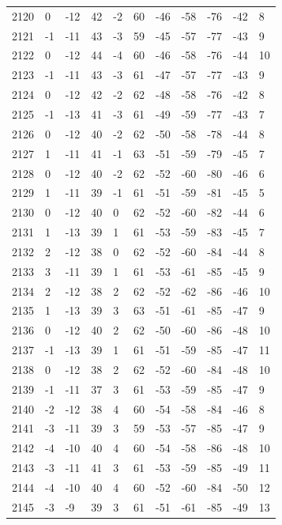 \begin{table}[H]
\begin{tabular}{lllllllllll}
2120 & 0 & -12 & 42 & -2 & 60 & -46 & -58 & -76 & -42 & 8 \\
2121 & -1 & -11 & 43 & -3 & 59 & -45 & -57 & -77 & -43 & 9 \\
2122 & 0 & -12 & 44 & -4 & 60 & -46 & -58 & -76 & -44 & 10 \\
2123 & -1 & -11 & 43 & -3 & 61 & -47 & -57 & -77 & -43 & 9 \\
2124 & 0 & -12 & 42 & -2 & 62 & -48 & -58 & -76 & -42 & 8 \\
2125 & -1 & -13 & 41 & -3 & 61 & -49 & -59 & -77 & -43 & 7 \\
2126 & 0 & -12 & 40 & -2 & 62 & -50 & -58 & -78 & -44 & 8 \\
2127 & 1 & -11 & 41 & -1 & 63 & -51 & -59 & -79 & -45 & 7 \\
2128 & 0 & -12 & 40 & -2 & 62 & -52 & -60 & -80 & -46 & 6 \\
2129 & 1 & -11 & 39 & -1 & 61 & -51 & -59 & -81 & -45 & 5 \\
2130 & 0 & -12 & 40 & 0 & 62 & -52 & -60 & -82 & -44 & 6 \\
2131 & 1 & -13 & 39 & 1 & 61 & -53 & -59 & -83 & -45 & 7 \\
2132 & 2 & -12 & 38 & 0 & 62 & -52 & -60 & -84 & -44 & 8 \\
2133 & 3 & -11 & 39 & 1 & 61 & -53 & -61 & -85 & -45 & 9 \\
2134 & 2 & -12 & 38 & 2 & 62 & -52 & -62 & -86 & -46 & 10 \\
2135 & 1 & -13 & 39 & 3 & 63 & -51 & -61 & -85 & -47 & 9 \\
2136 & 0 & -12 & 40 & 2 & 62 & -50 & -60 & -86 & -48 & 10 \\
2137 & -1 & -13 & 39 & 1 & 61 & -51 & -59 & -85 & -47 & 11 \\
2138 & 0 & -12 & 38 & 2 & 62 & -52 & -60 & -84 & -48 & 10 \\
2139 & -1 & -11 & 37 & 3 & 61 & -53 & -59 & -85 & -47 & 9 \\
2140 & -2 & -12 & 38 & 4 & 60 & -54 & -58 & -84 & -46 & 8 \\
2141 & -3 & -11 & 39 & 3 & 59 & -53 & -57 & -85 & -47 & 9 \\
2142 & -4 & -10 & 40 & 4 & 60 & -54 & -58 & -86 & -48 & 10 \\
2143 & -3 & -11 & 41 & 3 & 61 & -53 & -59 & -85 & -49 & 11 \\
2144 & -4 & -10 & 40 & 4 & 60 & -52 & -60 & -84 & -50 & 12 \\
2145 & -3 & -9 & 39 & 3 & 61 & -51 & -61 & -85 & -49 & 13 \\

\end{tabular}
\end{table}
